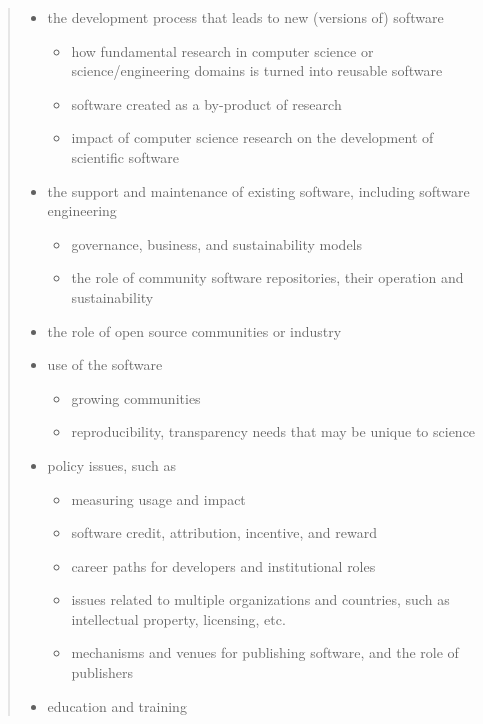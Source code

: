 \documentclass[11pt, oneside]{amsart}
\begin{document}
\begin{quote}
\begin{itemize}[leftmargin=0.2in]
\item the development process that leads to new (versions of) software
\begin{itemize}[leftmargin=0.2in]
\item how fundamental research in computer science or
  science/engineering domains is turned into reusable software
\item software created as a by-product of research
\item impact of computer science research on the development of
  scientific software
\end{itemize}
\item the support and maintenance of existing software, including
  software engineering
\begin{itemize}[leftmargin=0.2in]
\item governance, business, and sustainability models
\item the role of community software repositories, their operation and
  sustainability
\end{itemize}
\item the role of open source communities or industry
\item use of the software
\begin{itemize}[leftmargin=0.2in]
\item growing communities
\item reproducibility, transparency needs that may be unique to science
\end{itemize}
\item policy issues, such as
\begin{itemize}[leftmargin=0.2in]
\item measuring usage and impact
\item software credit, attribution, incentive, and reward
\item career paths for developers and institutional roles
\item issues related to multiple organizations and countries,
  such as intellectual property, licensing, etc.
\item mechanisms and venues for publishing software, and the role of
  publishers
\end{itemize}
\item education and training
\end{itemize}

\end{quote}
\end{document}
